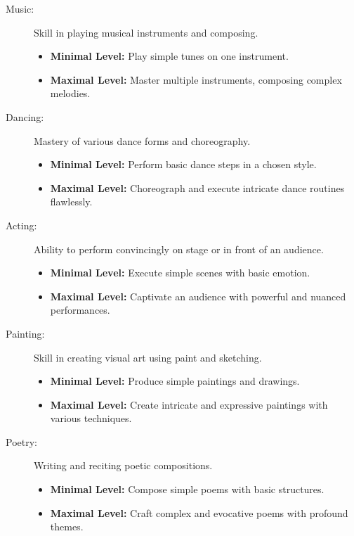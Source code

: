 \begin{description}
    \item[Music:] Skill in playing musical instruments and composing.
        \begin{itemize}
            \item \textbf{Minimal Level:} Play simple tunes on one instrument.
            \item \textbf{Maximal Level:} Master multiple instruments, composing complex melodies.
        \end{itemize}

    \item[Dancing:] Mastery of various dance forms and choreography.
        \begin{itemize}
            \item \textbf{Minimal Level:} Perform basic dance steps in a chosen style.
            \item \textbf{Maximal Level:} Choreograph and execute intricate dance routines flawlessly.
        \end{itemize}

    \item[Acting:] Ability to perform convincingly on stage or in front of an audience.
        \begin{itemize}
            \item \textbf{Minimal Level:} Execute simple scenes with basic emotion.
            \item \textbf{Maximal Level:} Captivate an audience with powerful and nuanced performances.
        \end{itemize}

    \item[Painting:] Skill in creating visual art using paint and sketching.
        \begin{itemize}
            \item \textbf{Minimal Level:} Produce simple paintings and drawings.
            \item \textbf{Maximal Level:} Create intricate and expressive paintings with various techniques.
        \end{itemize}

    \item[Poetry:] Writing and reciting poetic compositions.
        \begin{itemize}
            \item \textbf{Minimal Level:} Compose simple poems with basic structures.
            \item \textbf{Maximal Level:} Craft complex and evocative poems with profound themes.
        \end{itemize}


\end{description}
